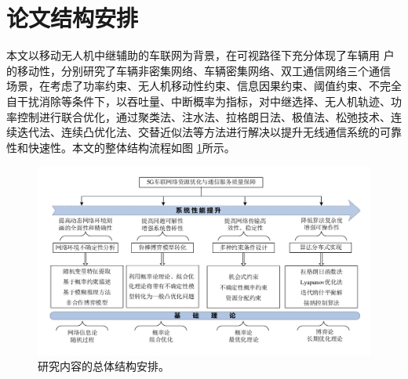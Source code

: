 \section{论文结构安排}\label{section1-4}
\textcolor[RGB]{202,12,22}{
本文以移动无人机中继辅助的车联网为背景，在可视路径下充分体现了车辆用
户的移动性，分别研究了车辆非密集网络、车辆密集网络、双工通信网络三个通信
场景，在考虑了功率约束、无人机移动性约束、信息因果约束、阈值约束、不完全
自干扰消除等条件下，以吞吐量、中断概率为指标，对中继选择、无人机轨迹、功
率控制进行联合优化，通过聚类法、注水法、拉格朗日法、极值法、松弛技术、连
续迭代法、连续凸优化法、交替近似法等方法进行解决以提升无线通信系统的可靠
性和快速性。本文的整体结构流程如图 \ref{结构安排}所示。}
\begin{figure}[H]
\centering
\includegraphics[width=16cm]{figures//chap1//研究内容的总体结构.pdf}
\caption{研究内容的总体结构安排。}
\label{结构安排}
\end{figure}

